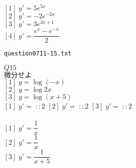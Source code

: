 \documentclass[10pt,dvipdfmx]{jarticle}
\begin{document}
$[1]\;y'=5e^{5x}$\\
$[2]\;y'=-2e^{-2x}$\\
$[3]\;y'=3e^{3x+1}$\\
$[4]\;y'=\dfrac{e^x-e^{-x}}{2}$\\
\newpage
\begin{center}
\verb|question0711-15.txt|\\
\end{center}
$Q15$\\
$\text{微分せよ}$\\
$[1]\;y=\log (-x) $\\
$[2]\;y=\log 2x $\\
$[3]\;y=\log (x+5) $\\
$[1]\;y'=\;::2$ 
$[2]\;y'=\;::2$ 
$[3]\;y'=\;::2$ 
\\
\\
$[1]\;y'=\dfrac{1}{x}$\\
$[2]\;y'=\dfrac{1}{x}$\\
$[3]\;y'=\dfrac{1}{x+5}$\\
\newpage
\end{document}
